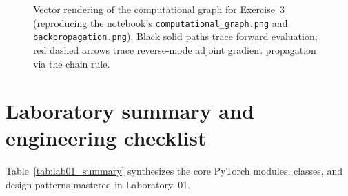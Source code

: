 \documentclass[../labs.tex]{subfiles}
\begin{document}
\begin{figure}[htbp]
\caption{Vector rendering of the computational graph for Exercise~3 (reproducing the notebook's \texttt{computational\_graph.png} and \texttt{backpropagation.png}). Black solid paths trace forward evaluation; red dashed arrows trace reverse-mode adjoint gradient propagation via the chain rule.}
\label{fig:lab01_tikz_dag}
\end{figure}


\section{Laboratory summary and engineering checklist}

Table~\ref{tab:lab01_summary} synthesizes the core PyTorch modules, classes, and design patterns mastered in Laboratory~01.
\end{document}
